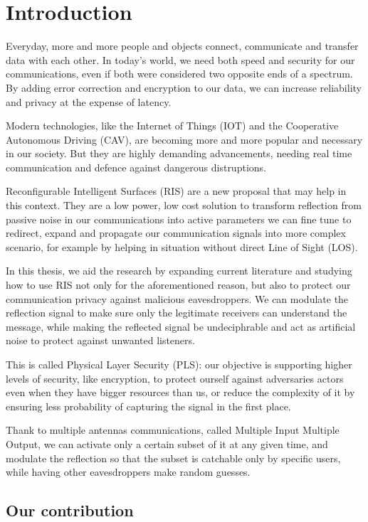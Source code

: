 \section{Introduction}

Everyday, more and more people and objects connect, communicate and transfer data with each other. In today's world, we need both speed and security for our communications, even if both were considered two opposite ends of a spectrum. By adding error correction and encryption to our data, we can increase reliability and privacy at the expense of latency.

Modern technologies, like the Internet of Things (IOT) and the Cooperative Autonomous Driving (CAV), are becoming more and more popular and necessary in our society. But they are highly demanding advancements, needing real time communication and defence against dangerous distruptions.

Reconfigurable Intelligent Surfaces (RIS) are a new proposal that may help in this context. They are a low power, low cost solution to transform reflection from passive noise in our communications into active parameters we can fine tune to redirect, expand and propagate our communication signals into more complex scenario, for example by helping in situation without direct Line of Sight (LOS).

In this thesis, we aid the research by expanding current literature and studying how to use RIS not only for the aforementioned reason, but also to protect our communication privacy against malicious eavesdroppers. We can modulate the reflection signal to make sure only the legitimate receivers can understand the message, while making the reflected signal be undeciphrable and act as artificial noise to protect against unwanted listeners.

This is called Physical Layer Security (PLS): our objective is supporting higher levels of security, like encryption, to protect ourself against adversaries actors even when they have bigger resources than us, or reduce the complexity of it by ensuring less probability of capturing the signal in the first place.

Thank to multiple antennas communications, called Multiple Input Multiple Output, we can activate only a certain subset of it at any given time, and modulate the reflection so that the subset is catchable only by specific users, while having other eavesdroppers make random guesses.

\subsection{Our contribution}

